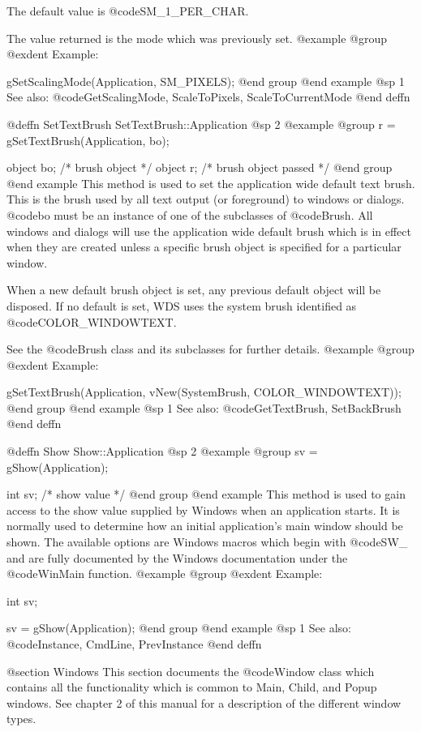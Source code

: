 The default value is @code{SM_1_PER_CHAR}.

The value returned is the mode which was previously set.
@example
@group
@exdent Example:

gSetScalingMode(Application, SM_PIXELS);
@end group
@end example
@sp 1
See also:  @code{GetScalingMode, ScaleToPixels, ScaleToCurrentMode}
@end deffn



@deffn {SetTextBrush} SetTextBrush::Application
@sp 2
@example
@group
r = gSetTextBrush(Application, bo);

object  bo;     /*  brush object         */
object  r;      /*  brush object passed  */
@end group
@end example
This method is used to set the application wide default text brush.
This is the brush used by all text output (or foreground) to windows or
dialogs.  @code{bo} must be an instance of one of the subclasses of
@code{Brush}.  All windows and dialogs will use the application wide
default brush which is in effect when they are created unless a specific
brush object is specified for a particular window.

When a new default brush object is set, any previous default object
will be disposed.  If no default is set, WDS uses the system brush
identified as @code{COLOR_WINDOWTEXT}.

See the @code{Brush} class and its subclasses for further details.
@example
@group
@exdent Example:

gSetTextBrush(Application, vNew(SystemBrush, COLOR_WINDOWTEXT));
@end group
@end example
@sp 1
See also:  @code{GetTextBrush, SetBackBrush}
@end deffn



@deffn {Show} Show::Application
@sp 2
@example
@group
sv = gShow(Application);

int     sv;     /*  show value   */
@end group
@end example
This method is used to gain access to the show value supplied by Windows
when an application starts.  It is normally used to determine how an
initial application's main window should be shown.  The available
options are Windows macros which begin with @code{SW_} and are fully
documented by the Windows documentation under the @code{WinMain}
function.
@example
@group
@exdent Example:

int     sv;

sv = gShow(Application);
@end group
@end example
@sp 1
See also:  @code{Instance, CmdLine, PrevInstance}
@end deffn



@section Windows
This section documents the @code{Window} class which contains all the
functionality which is common to Main, Child, and Popup windows.  See
chapter 2 of this manual for a description of the different window
types.






